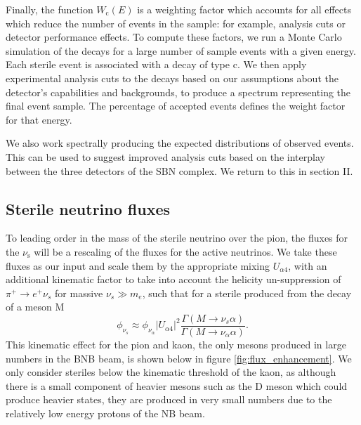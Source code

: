 \documentclass[11pt, a4paper]{article}
\begin{document}
%
Finally, the function $W_\text{c}(E)$ is a weighting factor which accounts for
all effects which reduce the number of events in the sample: for example,
analysis cuts or detector performance effects.
%
To compute these factors, we run a Monte Carlo simulation of the decays for a
large number of sample events with a given energy. Each sterile event is
associated with a decay of type $\text{c}$. We then apply experimental analysis
cuts to the decays based on our assumptions about the detector's capabilities
and backgrounds, to produce a spectrum representing the final event sample. The
percentage of accepted events defines the weight factor for that energy.

We also work spectrally producing the expected distributions of observed
events. This can be used to suggest improved analysis cuts based on the
interplay between the three detectors of the SBN complex. We return to this in
section II.

\subsection{Sterile neutrino fluxes}

To leading order in the mass of the sterile neutrino over the pion, the fluxes
for the $\nu_\text{s}$ will be a rescaling of the fluxes for the active
neutrinos.  We take these fluxes as our input and scale them by the appropriate mixing $U_{\alpha 4}$, with an additional kinematic factor to take into account the helicity un-suppression of $\pi^+ \rightarrow e^+\nu_s$ for massive $\nu_s \gg m_e$, such that for a sterile produced from the decay of a meson M
\[
	\phi_{\nu_s} \approx \phi_{\nu_\alpha} \vert U_{\alpha 4}\vert^2 \frac{\Gamma(M \rightarrow \nu_s \alpha)}{\Gamma(M\rightarrow \nu_\alpha \alpha)}.
\]
This kinematic effect for the pion and kaon, the only mesons produced in large numbers in the BNB beam, is shown below in figure \ref{fig:flux_enhancement}. We only consider steriles below the kinematic threshold of the kaon, as although there is a small component of heavier mesons such as the D meson which could produce heavier states, they are produced in very small numbers due to the relatively low energy protons of the NB beam. 
\end{document}

